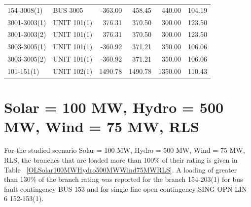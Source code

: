 \documentclass[10pt]{report}
\begin{document}
\begin{table}[H]
{\begin{tabular}{llrrrr}
154-3008(1) & BUS 3005 & -363.00 & 458.45 & 440.00 & 104.19 \\
3001-3003(1) & UNIT 101(1) & 376.31 & 370.50 & 300.00 & 123.50 \\
3001-3003(2) & UNIT 101(1) & 376.31 & 370.50 & 300.00 & 123.50 \\
3003-3005(1) & UNIT 101(1) & -360.92 & 371.21 & 350.00 & 106.06 \\
3003-3005(2) & UNIT 101(1) & -360.92 & 371.21 & 350.00 & 106.06 \\
101-151(1) & UNIT 102(1) & 1490.78 & 1490.78 & 1350.00 & 110.43 \\
\bottomrule
\end{tabular}}
\end{table}

\section{Solar = 100 MW, Hydro = 500 MW, Wind = 75 MW, RLS}
For the studied scenario Solar = 100 MW, Hydro = 500 MW, Wind = 75 MW, RLS, the branches that are loaded more than 100\% of their rating is given in Table ~\ref{OLSolar100MWHydro500MWWind75MWRLS}. A loading of greater than 130\% of the branch rating was reported for the branch 154-203(1) for bus fault contingency BUS 153 and for single line open contingency SING OPN LIN   6 152-153(1).
\end{document}
